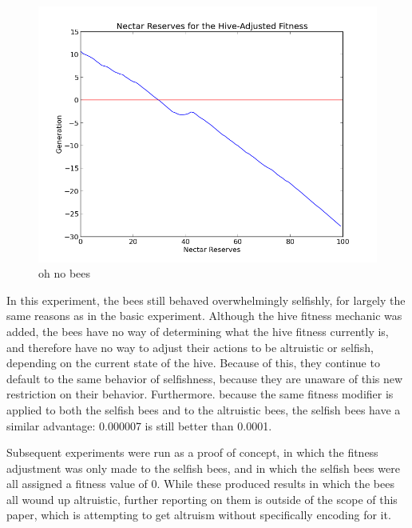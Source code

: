 \documentclass[11pt]{article}
\begin{document}
			\begin{figure}[tb]
				\begin{center}
					\includegraphics[scale=.75]{results/hive_fitness_res.png}
				\end{center}
				\caption{oh no bees}
				\label{fig:hive_fitness_reserves}
			\end{figure}

			In this experiment, the bees still behaved overwhelmingly selfishly, for largely the same reasons as in the basic experiment. Although the hive fitness mechanic was added, the bees have no way of determining what the hive fitness currently is, and therefore have no way to adjust their actions to be altruistic or selfish, depending on the current state of the hive. Because of this, they continue to default to the same behavior of selfishness, because they are unaware of this new restriction on their behavior. Furthermore. because the same fitness modifier is applied to both the selfish bees and to the altruistic bees, the selfish bees have a similar advantage: 0.000007 is still better than 0.0001.

			Subsequent experiments were run as a proof of concept, in which the fitness adjustment was only made to the selfish bees, and in which the selfish bees were all assigned a fitness value of 0. While these produced results in which the bees all wound up altruistic, further reporting on them is outside of the scope of this paper, which is attempting to get altruism without specifically encoding for it.

\end{document}
